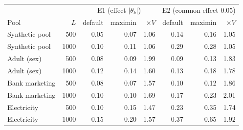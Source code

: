 \begin{tabular}{lr rrr rrr}\toprule
 & & \multicolumn{3}{c}{E1 (effect $|\theta_k|$)} & \multicolumn{3}{c}{E2 (common effect $0.05$)} \\
Pool & $L$ & default & maximin & $\times V$ & default & maximin & $\times V$ \\\midrule
Synthetic pool & 500 & 0.05 & 0.07 & 1.06 & 0.14 & 0.16 & 1.05 \\
Synthetic pool & 1000 & 0.10 & 0.11 & 1.06 & 0.29 & 0.28 & 1.05 \\
Adult (sex) & 500 & 0.08 & 0.09 & 1.99 & 0.09 & 0.13 & 1.83 \\
Adult (sex) & 1000 & 0.12 & 0.14 & 1.60 & 0.13 & 0.18 & 1.78 \\
Bank marketing & 500 & 0.08 & 0.07 & 1.57 & 0.10 & 0.12 & 1.86 \\
Bank marketing & 1000 & 0.10 & 0.10 & 1.69 & 0.17 & 0.23 & 2.01 \\
Electricity & 500 & 0.10 & 0.15 & 1.47 & 0.23 & 0.35 & 1.74 \\
Electricity & 1000 & 0.15 & 0.20 & 1.57 & 0.37 & 0.65 & 1.92 \\
\bottomrule\end{tabular}
